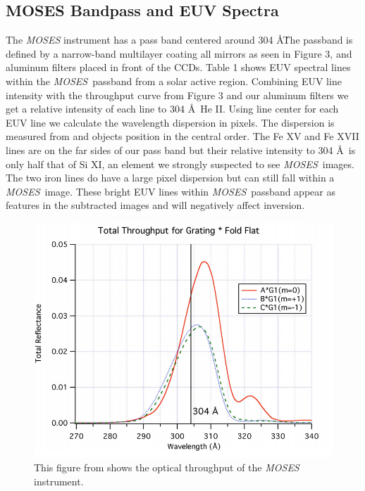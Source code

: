 \documentclass[]{aastex6}
\newcommand{\MOSES}{\textit{MOSES}}
\begin{document}
\subsection{MOSES Bandpass and EUV Spectra}   
	The \textit{MOSES} instrument has a pass band centered around 304 \AA \. The passband is defined by a narrow-band multilayer coating all mirrors \citep{Owens2005} as seen in Figure 3, and aluminum filters placed in front of the CCDs. Table 1 shows EUV spectral lines within the \MOSES \ passband \citep{Spec98} from a solar active region. Combining EUV line intensity with the throughput curve from Figure 3 and our aluminum filters we get a relative intensity of each line to 304 \AA \ He II.  Using line center for each EUV line we calculate the wavelength dispersion in pixels.  The dispersion is measured from and objects position in the central order.  The Fe XV and Fe XVII lines are on the far sides of our pass band but their relative intensity to 304 \AA \ is only half that of Si XI, an element we strongly suspected to see \MOSES \ images.  The two iron lines do have a large pixel dispersion but can still fall within a \MOSES \ image.  These bright EUV lines within \MOSES \ passband appear as features in the subtracted images and will negatively affect inversion.


\begin{figure}[t]
\centering
\includegraphics[scale=.5]{images/MOSES_throughput.png}
\caption{This figure from \citep{Owens2005} shows the optical throughput of the \textit{MOSES} instrument.}
\end{figure}	
\end{document}
